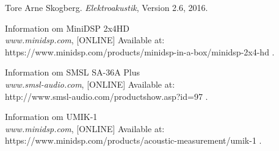 \begin{thebibliography}{9}


	Tore Arne Skogberg.
	\textit{Elektroakustik},
	Version 2.6,
	2016.
		
	Information om MiniDSP 2x4HD\\
	\textit{www.minidsp.com},
	[ONLINE] Available at:\\ https://www.minidsp.com/products/minidsp-in-a-box/minidsp-2x4-hd
	.
	
	Information om SMSL SA-36A Plus\\
	\textit{www.smsl-audio.com},
	[ONLINE] Available at:\\ http://www.smsl-audio.com/productshow.asp?id=97
	.	
	
	
	Information om UMIK-1\\
	\textit{www.minidsp.com},
	[ONLINE] Available at:\\ https://www.minidsp.com/products/acoustic-measurement/umik-1
	.
	
	


\end{thebibliography}